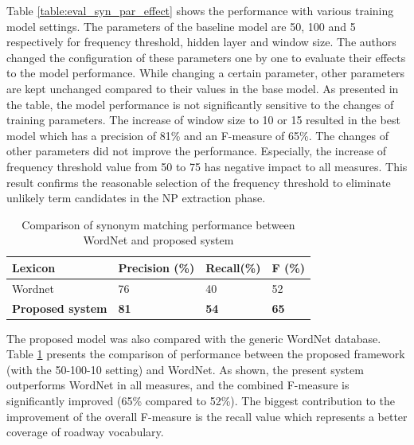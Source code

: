 \documentclass[Journal, BackFigs,NoLists, DoubleSpace]{ascelike}%
\begin{document}
%
Table \ref{table:eval_syn_par_effect} shows the performance with various training model settings. The parameters of the baseline model are 50, 100 and 5 respectively for frequency threshold, hidden layer and window size. The authors changed the configuration of these parameters one by one to evaluate their effects to the model performance. While changing a certain parameter, other parameters are kept unchanged compared to their values in the base model. As presented in the table, the model performance is not significantly sensitive to the changes of training parameters. The increase of window size to 10 or 15 resulted in the best model which has a precision of 81\% and an F-measure of 65\%. The changes of other parameters did not improve the performance. Especially, the increase of frequency threshold value from 50 to 75 has negative impact to all measures. This result confirms the reasonable selection of the frequency threshold to eliminate unlikely term candidates in the NP extraction phase.
%
\begin{table} [b] 
	\caption{Comparison of synonym matching performance between WordNet and proposed system}
	\label{table:eval_syn_vs_Wordnet}
	\centering
	\small
	\renewcommand{\arraystretch}{1.25}
	\begin{tabular}{l l l l }
		\hline
		\hline
		\textbf{Lexicon} & \textbf{Precision (\%)}  & \textbf{Recall(\%)} & \textbf{F (\%)}\\
		\hline
		Wordnet	&76 	&40 	&52\\	
		\textbf{Proposed system} &\textbf{81}	&\textbf{54}		&\textbf{65}\\	
		\hline
		\hline
	\end{tabular}
	\normalsize
\end{table}
\par
The proposed model was also compared with the generic WordNet database. Table \ref{table:eval_syn_vs_Wordnet} presents the comparison of performance between the proposed framework (with the 50-100-10 setting) and WordNet. As shown, the present system outperforms WordNet in all measures, and the combined F-measure is significantly improved (65\% compared to 52\%). The biggest contribution to the improvement of the overall F-measure is the recall value which represents a better coverage of roadway vocabulary. 
%
\end{document}
